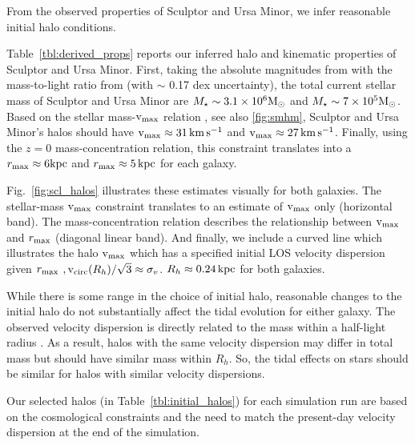 From the observed properties of Sculptor and Ursa Minor, we infer
reasonable \LCDM{} initial halo conditions.

Table~\ref{tbl:derived_props} reports our inferred halo and kinematic
properties of Sculptor and Ursa Minor. First, taking the absolute
magnitudes from \citet{munoz+2018} with the mass-to-light ratio from
\citet{woo+courteau+dekel2008} (with \(\sim\) 0.17 dex uncertainty), the
total current stellar mass of Sculptor and Ursa Minor are
\(M_\star \sim 3.1 \times 10^6 {\rm M}_{\odot}\) and
\(M_\star \sim 7 \times 10^5 {\rm M}_{\odot}\). Based on the stellar mass-\({\rm v}_{\rm max}\)
relation \citep[from][]{fattahi+2018}, see also \ref{fig:smhm}, Sculptor
and Ursa Minor's halos should have \({\rm v}_{\rm max} \approx 31 \,{\rm km\,s^{-1}}\) and
\({\rm v}_{\rm max} \approx 27\,{\rm km\,s^{-1}}\). Finally, using the \citet{ludlow+2016}
\(z=0\) mass-concentration relation, this constraint translates into a
\(r_{\rm max} \approx 6 {\rm kpc}\) and \(r_{\rm max} \approx 5\,{\rm kpc}\) for each
galaxy.

Fig.~\ref{fig:scl_halos} illustrates these estimates visually for both
galaxies. The stellar-mass \({\rm v}_{\rm max}\) constraint translates to an
estimate of \({\rm v}_{\rm max}\) only (horizontal band). The mass-concentration
relation describes the relationship between \({\rm v}_{\rm max}\) and \(r_{\rm max}\)
(diagonal linear band). And finally, we include a curved line which
illustrates the halo \({\rm v}_{\rm max}\) which has a specified initial LOS
velocity dispersion given \(r_{\rm max}\)
\(, {\rm v}_{\rm circ}(R_h) / \sqrt{3} \approx \sigma_v\).
\(R_h \approx 0.24\,{\rm kpc}\) for both galaxies.

While there is some range in the choice of initial halo, reasonable
changes to the initial halo do not substantially affect the tidal
evolution for either galaxy. The observed velocity dispersion is
directly related to the mass within a half-light radius
\citep[e.g.,][]{wolf+2010}. As a result, halos with the same velocity
dispersion may differ in total mass but should have similar mass within
\(R_h\). So, the tidal effects on stars should be similar for halos with
similar velocity dispersions.

Our selected halos (in Table~\ref{tbl:initial_halos}) for each
simulation run are based on the cosmological constraints and the need to
match the present-day velocity dispersion at the end of the simulation.


